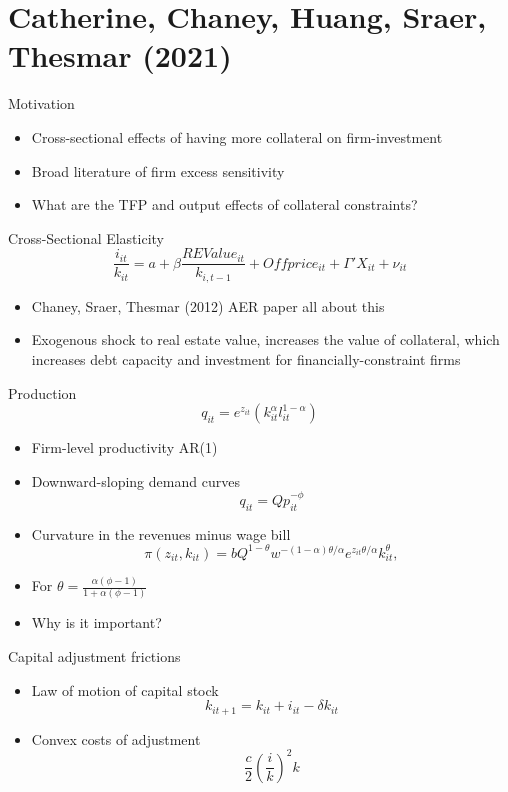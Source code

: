 \documentclass[english,xcolor=svgnames]{beamer}
\begin{document}
\section{Catherine, Chaney, Huang, Sraer, Thesmar (2021)}


\begin{frame}{Motivation}
\begin{itemize}
\item Cross-sectional effects of having more collateral on firm-investment
\item Broad literature of firm excess sensitivity
\item What are the TFP and output effects of collateral constraints?
\end{itemize}
\end{frame}

\begin{frame}{Cross-Sectional Elasticity}
\[ \frac{i_{it}}{k_{it}} = a + \beta \frac{REValue_{it}}{k_{i,t-1}} + Offprice_{it} + \Gamma' X_{it} + \nu_{it}\]
\begin{itemize}
\item Chaney, Sraer, Thesmar (2012) AER paper all about this
\item Exogenous shock to real estate value, increases the value of collateral, which increases debt capacity and investment for financially-constraint firms
\end{itemize}
\end{frame}

\begin{frame}{Production}
\[q_{it} = e^{z_{it}} \left(k_{it}^{\alpha} l_{it}^{1-\alpha}\right)\]
\begin{itemize}
\item Firm-level productivity AR(1)
\item Downward-sloping demand curves
\[q_{it} = Q p_{it}^{-\phi}\]
\item Curvature in the revenues minus wage bill
\[\pi(z_{it},k_{it}) = bQ^{1-\theta} w^{-(1-\alpha)\theta/\alpha} e^{z_{it} \theta/\alpha} k_{it}^{\theta}, \]
\item For $\theta = \frac{\alpha(\phi-1)}{1+\alpha(\phi-1)}$
\item Why is it important?
\end{itemize}
\end{frame}

\begin{frame}{Capital adjustment frictions}
\begin{itemize}
\item Law of motion of capital stock
\[k_{it+1} = k_{it} + i_{it} -\delta k_{it} \]
\item Convex costs of adjustment
\[\frac{c}{2} \left(\frac{i}{k}\right)^2 k \]
\end{itemize}
\end{frame}
\end{document}
